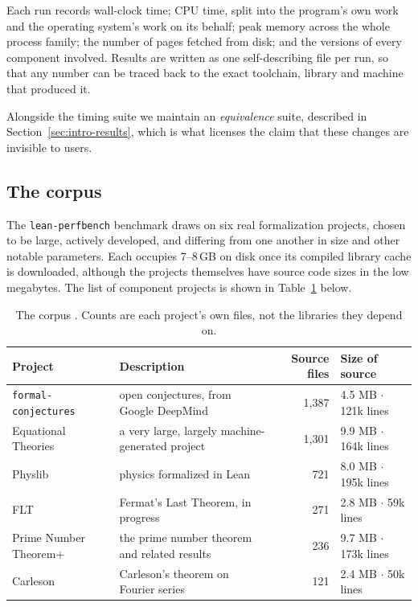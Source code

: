 \documentclass{article}
\newcommand{\Lean}{Lean\xspace}      %
\newcommand{\perfbench}{\texttt{lean-perfbench}\xspace}
\begin{document}
Each run records wall-clock time; CPU time, split into the program's own work and the operating system's work on its behalf; peak memory across the whole process family; the number of pages fetched from disk; and the versions of every component involved. Results are written as one self-describing file per run, so that any number can be traced back to the exact toolchain, library and machine that produced it.

Alongside the timing suite we maintain an \emph{equivalence} suite, described in Section~\ref{sec:intro-results}, which is what licenses the claim that these changes are invisible to users.

\subsection{The corpus}

The \perfbench benchmark draws on six real formalization projects, chosen to be large, actively developed, and differing from one another in size and other notable parameters. Each occupies 7--8\,GB on disk once its compiled library cache is downloaded, although the projects themselves have source code sizes in the low megabytes. The list of component projects is shown in Table~\ref{tab:corpus} below.

\begin{table}[htbp]
\centering
\footnotesize
\setlength{\tabcolsep}{4pt}
\begin{tabular}{llrl}
\toprule
Project & Description & Source files & Size of source \\
\midrule
\texttt{formal-conjectures} & open conjectures, from Google DeepMind & 1{,}387 & 4.5 MB $\cdot$ 121k lines \\
Equational Theories & a very large, largely machine-generated project & 1{,}301 & 9.9 MB $\cdot$ 164k lines \\
Physlib & physics formalized in \Lean & 721 & 8.0 MB $\cdot$ 195k lines \\
FLT & Fermat's Last Theorem, in progress & 271 & 2.8 MB $\cdot$ 59k lines \\
Prime Number Theorem+ & the prime number theorem and related results & 236 & 9.7 MB $\cdot$ 173k lines \\
Carleson & Carleson's theorem on Fourier series & 121 & 2.4 MB $\cdot$ 50k lines \\
\bottomrule
\end{tabular}
\caption{The corpus \cite{formal-conjectures,equational,physlean,flt,pnt,carleson}. Counts are each project's own files, not the libraries they depend on.}
\label{tab:corpus}
\end{table}
\end{document}
